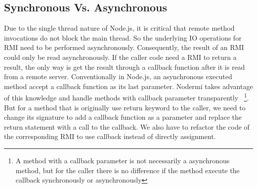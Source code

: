 \subsection{Synchronous Vs. Asynchronous}
Due to the single thread nature of Node.js,
it is critical that remote method invocations do not block the main thread.
So the underlying IO operations for RMI need to be performed asynchronously.
Consequently, the result of an RMI could only be read asynchronously.
If the caller code need a RMI to return a result,
the only way is get the result through a callback function
after it is read from a remote server.
Conventionally in Node.js, an asynchronous executed method
accept a callback function as its last parameter.
Nodermi takes advantage of this knowledge and handle methods with callback parameter transparently
~\footnote{A method with a callback parameter is not necessarily a asynchronous method,
but for the caller there is no difference if the method execute the callback synchronously or asynchronously}.
But for a method that is originally use return keyword to the caller,
we need to change its signature to add a callback function as a parameter and
replace the return statement with a call to the callback. %
We also have to refactor the code of the corresponding RMI to use callback instead of
directly assignment.




